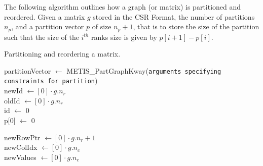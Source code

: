 The following algorithm outlines how a graph (or matrix) is partitioned and reordered. Given a matrix \(g\) stored in the CSR Format, the number of partitions \(n_{p}\), and a partition vector \(p\) of size \(n_{p} + 1\), that is to store the size of the partition such that the size of the \(i^{th}\) ranks size is given by \(p[i+1] - p[i]\).
\medskip

\begin{algorithm}[H]
    \caption{Partitioning and reordering a matrix.}
    \SetAlgoVlined


    partitionVector \(\gets\) METIS\_PartGraphKway(\texttt{arguments specifying constraints for partition})\\

    newId \(\gets [0] \cdot g.n_{r}\)\\
    oldId \(\gets [0] \cdot g.n_{r}\)\\
    id \(\gets\) 0 \\
    p[0] \(\gets\) 0 \\


    newRowPtr \(\gets [0] \cdot g.n_{r} + 1\)\\
    newColIdx \(\gets [0] \cdot g.n_{c}\)\\
    newValues \(\gets [0] \cdot g.n_{c}\)\\


\end{algorithm}
